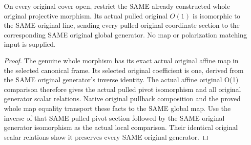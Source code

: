 \begin{theorem}
\label{thm:fc-generated-line-projective-local-twist}
\leanok
{}
On every original cover open, restrict the SAME already constructed
whole original projective morphism. Its actual pulled original
$O(1)$ is isomorphic to the SAME original line, sending every
pulled original coordinate section to the corresponding SAME
original global generator. No map or polarization matching input
is supplied.
\end{theorem}
\begin{proof}
The genuine whole morphism has its exact actual original affine
map in the selected canonical frame. Its selected original
coefficient is one, derived from the SAME original generator's
inverse identity. The actual affine original O(1) comparison therefore gives the
actual pulled pivot isomorphism and all original generator scalar
relations. Native original pullback composition and the proved
whole map equality transport these facts to the SAME global map.
Use the inverse of that SAME pulled pivot section followed by the
SAME original generator isomorphism as the actual local comparison.
Their identical original scalar relations show it preserves every
SAME original generator.
\end{proof}

